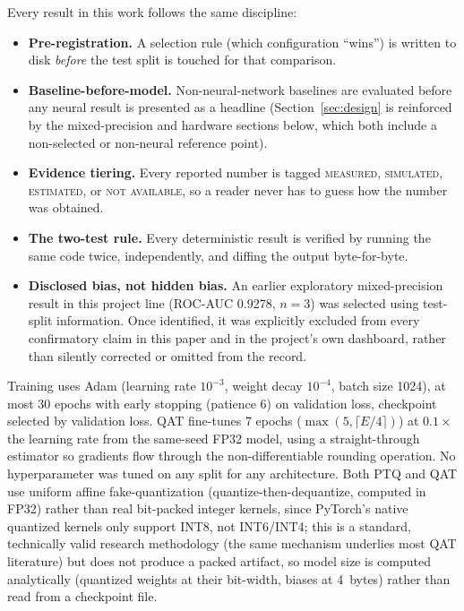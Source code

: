 \documentclass[11pt]{article}
\newcommand{\tierm}{\textsc{measured}}
\newcommand{\tiers}{\textsc{simulated}}
\newcommand{\tiere}{\textsc{estimated}}
\newcommand{\tiern}{\textsc{not available}}
\begin{document}
Every result in this work follows the same discipline:

\begin{itemize}
  \item \textbf{Pre-registration.} A selection rule (which configuration ``wins'') is written to disk
    \emph{before} the test split is touched for that comparison.
  \item \textbf{Baseline-before-model.} Non-neural-network baselines are evaluated before any neural
    result is presented as a headline (Section~\ref{sec:design} is reinforced by the mixed-precision
    and hardware sections below, which both include a non-selected or non-neural reference point).
  \item \textbf{Evidence tiering.} Every reported number is tagged \tierm{}, \tiers{}, \tiere{}, or
    \tiern{}, so a reader never has to guess how the number was obtained.
  \item \textbf{The two-test rule.} Every deterministic result is verified by running the same code
    twice, independently, and diffing the output byte-for-byte.
  \item \textbf{Disclosed bias, not hidden bias.} An earlier exploratory mixed-precision result in this
    project line (ROC-AUC 0.9278, $n=3$) was selected using test-split information. Once identified,
    it was explicitly excluded from every confirmatory claim in this paper and in the project's own
    dashboard, rather than silently corrected or omitted from the record.
\end{itemize}

Training uses Adam (learning rate $10^{-3}$, weight decay $10^{-4}$, batch size 1024), at most 30
epochs with early stopping (patience 6) on validation loss, checkpoint selected by validation loss.
QAT fine-tunes 7 epochs ($\max(5, \lceil E/4 \rceil)$) at $0.1\times$ the learning rate from the
same-seed FP32 model, using a straight-through estimator so gradients flow through the
non-differentiable rounding operation. No hyperparameter was tuned on any split for any architecture.
Both PTQ and QAT use uniform affine fake-quantization (quantize-then-dequantize, computed in FP32)
rather than real bit-packed integer kernels, since PyTorch's native quantized kernels only support
INT8, not INT6/INT4; this is a standard, technically valid research methodology (the same mechanism
underlies most QAT literature) but does not produce a packed artifact, so model size is computed
analytically (quantized weights at their bit-width, biases at 4~bytes) rather than read from a
checkpoint file.
\end{document}
